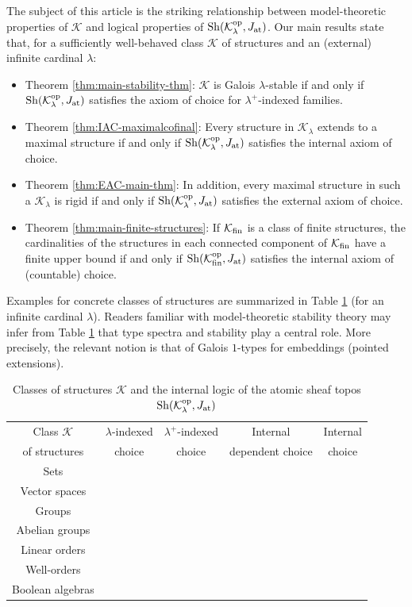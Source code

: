 \documentclass[10pt]{amsart}
\numberwithin{equation}{section}
\theoremstyle{plain}
\theoremstyle{definition}
\newcommand{\K}{\mathcal{K}}
\newcommand{\ittm}{{\ding{52}}}
\newcommand{\dame}{{\ding{56}}}
\begin{document}
The subject of this article is the striking relationship between model-theoretic properties of $\K$ and logical properties of ${\rm Sh}(\K_\lambda^{\rm op},J_{\rm at})$.
Our main results state that, for a sufficiently well-behaved class $\K$ of structures and an (external) infinite cardinal $\lambda$:
\begin{itemize}
\item Theorem \ref{thm:main-stability-thm}: $\K$ is Galois $\lambda$-stable if and only if ${\rm Sh}(\K_\lambda^{\rm op},J_{\rm at})$ satisfies the axiom of choice for $\lambda^+$-indexed families.
\item Theorem \ref{thm:IAC-maximalcofinal}: Every structure in $\K_\lambda$ extends to a maximal structure if and only if ${\rm Sh}(\K_\lambda^{\rm op},J_{\rm at})$ satisfies the internal axiom of choice.
\item Theorem \ref{thm:EAC-main-thm}: In addition, every maximal structure in such a $\K_\lambda$ is rigid if and only if ${\rm Sh}(\K_\lambda^{\rm op},J_{\rm at})$ satisfies the external axiom of choice.
\item Theorem \ref{thm:main-finite-structures}: If $\K_{\rm fin}$ is a class of finite structures, the cardinalities of the structures in each connected component of $\K_{\rm fin}$ have a finite upper bound if and only if ${\rm Sh}(\K^{\rm op}_{\rm fin},J_{\rm at})$ satisfies the internal axiom of (countable) choice.
\end{itemize}

Examples for concrete classes of structures are summarized in Table \ref{table-1} (for an infinite cardinal $\lambda$).
Readers familiar with model-theoretic stability theory may infer from Table \ref{table-1} that type spectra and stability play a central role.
More precisely, the relevant notion is that of Galois $1$-types for embeddings (pointed extensions).

\begin{table}[t]\centering\small
\begin{tabular}{c|cccc}
Class $\mathcal{K}$ & $\lambda$-indexed  &  $\lambda^+$-indexed & Internal & Internal \\
of structures & choice & choice & dependent choice & choice \\ \hline
Sets & \ittm & \ittm & \ittm &\dame  \\
Vector spaces & \ittm & \ittm & \ittm& \dame \\
Groups & \ittm &  \dame & \ittm &\dame \\
Abelian groups & \ittm & \ittm & \ittm &\dame \\
Linear orders & \ittm & \dame & \ittm &\dame \\
Well-orders & \ittm & \dame & \dame & \dame \\
Boolean algebras & \ittm & \dame & \ittm &\dame \\
[0.5em]
\end{tabular}
\caption{\small Classes of structures $\mathcal{K}$ and the internal logic of the atomic sheaf topos ${\rm Sh}(\mathcal{K}_\lambda^{\rm op},J_{\rm at})$}\label{table-1}
\end{table}
\end{document}
